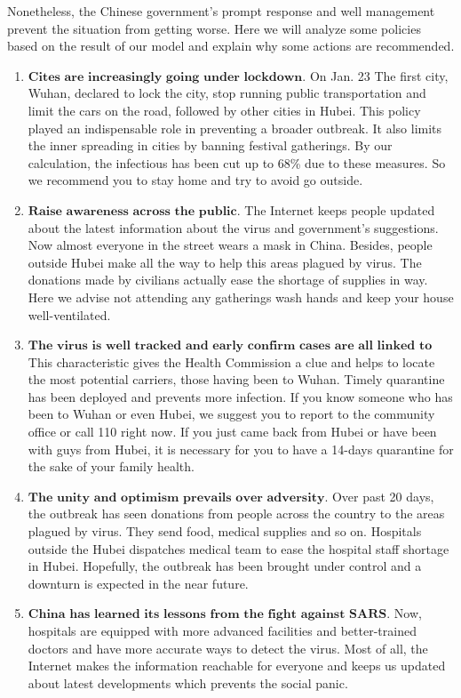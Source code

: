 \documentclass[12pt]{mcmthesis}
\begin{document}
Nonetheless, the Chinese government's prompt response and well management prevent the situation from getting worse. Here we will analyze some policies based on the result of our model and explain why some actions are recommended.

\begin{enumerate}
    \item $\textbf{Cites are increasingly going under lockdown.}$ On Jan. 23 The first city, Wuhan, declared to lock the city, stop running public transportation and limit the cars on the road, followed by other cities in Hubei. This policy played an indispensable role in preventing a broader outbreak. It also limits the inner spreading in cities by banning festival gatherings. By our calculation, the infectious has been cut up to 68\% due to these measures. So we recommend you to stay home and try to avoid go outside.
    \item $\textbf{Raise awareness across the public.}$ The Internet keeps people updated about the latest information about the virus and government's suggestions. Now almost everyone in the street wears a mask in China.  Besides, people outside Hubei make all the way to help this areas plagued by virus. The donations made by civilians actually ease the shortage of supplies in way. Here we advise not attending any gatherings wash hands and keep your house well-ventilated.
    \item  $\textbf{The virus is well tracked and early confirm cases are all linked to Wuhan.}$ This characteristic gives the Health Commission a clue and helps to locate the most potential carriers, those having been to Wuhan. Timely quarantine has been deployed and prevents more infection. If you know someone who has been to Wuhan or even Hubei, we suggest you to report to the community office or call 110 right now. If you just came back from Hubei or have been with guys from Hubei, it is necessary for you to have a 14-days quarantine for the sake of your family health.
    \item $\textbf{The unity and optimism prevails over adversity.}$ Over past 20 days, the outbreak has seen donations from people across the country to the areas plagued by virus. They send food, medical supplies and so on. Hospitals outside the Hubei dispatches medical team to ease the hospital staff shortage in Hubei. Hopefully, 
    the outbreak has been brought under control and a downturn is expected in the near future. 
    \item $\textbf{China has learned its lessons from the fight against SARS.}$ Now, hospitals are  equipped with more advanced facilities and better-trained doctors and have more accurate ways to detect the virus. Most of all, the Internet makes the information reachable for everyone and keeps us updated about latest developments which prevents the social panic. 
\end{enumerate}
\end{document}
